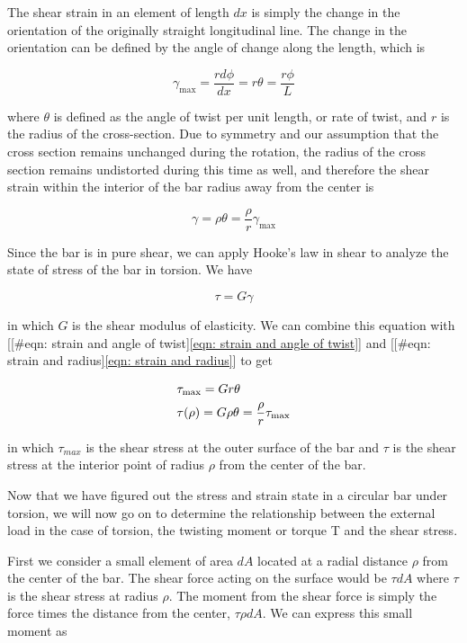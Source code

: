 \documentclass[a4paper,openany,12pt]{book}
\begin{document}
The shear strain in an element of length \(dx\) is simply the change in
the orientation of the originally straight longitudinal line. The change
in the orientation can be defined by the angle of change along the
length, which is

$$\gamma _{\max } = \frac{rd\phi }{dx} = r\theta  = \frac{r\phi }{L}$$

where \(\theta\) is defined as the angle of twist per unit length, or rate
of twist, and \(r\) is the radius of the cross-section. Due to symmetry
and our assumption that the cross section remains unchanged during the
rotation, the radius of the cross section remains undistorted during
this time as well, and therefore the shear strain within the interior of
the bar radius away from the center is

$$ \gamma  = \rho \theta  = \frac{\rho }{r}\gamma _{\max }$$

Since the bar is in pure shear, we can apply Hooke's law in shear to
analyze the state of stress of the bar in torsion. We have

$$\tau  = G\gamma$$

in which \(G\) is the shear modulus of elasticity. We can combine this
equation with
[[\#eqn: strain and angle of twist]\ref{eqn: strain and angle of twist}]
and [[\#eqn: strain and radius]\ref{eqn: strain and radius}] to get

$$\begin{gathered}
    \tau _{\max } = Gr\theta  \hfill \\
    \tau (\rho ) = G\rho \theta  = \dfrac{\rho }{r}\tau _{\max } \hfill \\ 
  \end{gathered}$$

in which \(\tau_{max}\) is the shear stress at the outer surface of the
bar and \(\tau\) is the shear stress at the interior point of radius
\(\rho\) from the center of the bar.

Now that we have figured out the stress and strain state in a circular
bar under torsion, we will now go on to determine the relationship
between the external load in the case of torsion, the twisting moment or
torque T and the shear stress.

First we consider a small element of area \(dA\) located at a radial
distance \(\rho\) from the center of the bar. The shear force acting on
the surface would be \(\tau dA\) where \(\tau\) is the shear stress at
radius \(\rho\). The moment from the shear force is simply the force times
the distance from the center, \(\tau \rho dA\). We can express this small
moment as
\end{document}
